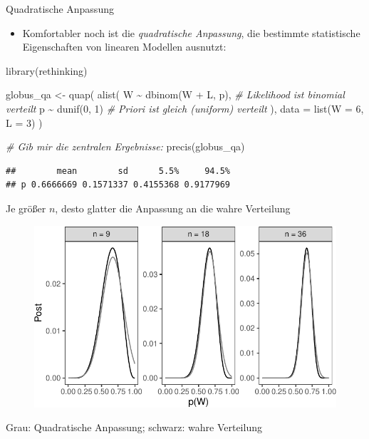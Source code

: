 \documentclass[
  ngerman,
  ignorenonframetext,
]{beamer}
\newenvironment{Shaded}{\begin{snugshade}}{\end{snugshade}}
\newcommand{\AttributeTok}[1]{\textcolor[rgb]{0.77,0.63,0.00}{#1}}
\newcommand{\CommentTok}[1]{\textcolor[rgb]{0.56,0.35,0.01}{\textit{#1}}}
\newcommand{\DecValTok}[1]{\textcolor[rgb]{0.00,0.00,0.81}{#1}}
\newcommand{\FunctionTok}[1]{\textcolor[rgb]{0.00,0.00,0.00}{#1}}
\newcommand{\NormalTok}[1]{#1}
\newcommand{\OtherTok}[1]{\textcolor[rgb]{0.56,0.35,0.01}{#1}}
\newcommand{\SpecialCharTok}[1]{\textcolor[rgb]{0.00,0.00,0.00}{#1}}
\providecommand{\tightlist}{%
  \setlength{\itemsep}{0pt}\setlength{\parskip}{0pt}}
\begin{document}
\begin{frame}[fragile]{Quadratische Anpassung}
\protect\hypertarget{quadratische-anpassung}{}
\begin{itemize}
\tightlist
\item
  Komfortabler noch ist die \emph{quadratische Anpassung}, die bestimmte
  statistische Eigenschaften von linearen Modellen ausnutzt:
\end{itemize}

\tiny

\begin{Shaded}
\begin{Highlighting}[]
\FunctionTok{library}\NormalTok{(rethinking)}

\NormalTok{globus\_qa }\OtherTok{\textless{}{-}} \FunctionTok{quap}\NormalTok{(}
  \FunctionTok{alist}\NormalTok{(}
\NormalTok{    W }\SpecialCharTok{\textasciitilde{}} \FunctionTok{dbinom}\NormalTok{(W }\SpecialCharTok{+}\NormalTok{ L, p),  }\CommentTok{\# Likelihood ist binomial verteilt}
\NormalTok{    p }\SpecialCharTok{\textasciitilde{}} \FunctionTok{dunif}\NormalTok{(}\DecValTok{0}\NormalTok{, }\DecValTok{1}\NormalTok{)        }\CommentTok{\# Priori ist gleich (uniform) verteilt}
\NormalTok{  ), }
  \AttributeTok{data =} \FunctionTok{list}\NormalTok{(}\AttributeTok{W =} \DecValTok{6}\NormalTok{, }\AttributeTok{L =} \DecValTok{3}\NormalTok{)}
\NormalTok{)}

\CommentTok{\# Gib mir die zentralen Ergebnisse:}
\FunctionTok{precis}\NormalTok{(globus\_qa)}
\end{Highlighting}
\end{Shaded}

\begin{verbatim}
##        mean        sd      5.5%     94.5%
## p 0.6666669 0.1571337 0.4155368 0.9177969
\end{verbatim}

\normalsize
\end{frame}

\begin{frame}{Je größer \(n\), desto glatter die Anpassung an die wahre
Verteilung}
\protect\hypertarget{je-gruxf6uxdfer-n-desto-glatter-die-anpassung-an-die-wahre-verteilung}{}
\begin{figure}[H]
\includegraphics[width=1\linewidth]{unnamed-chunk-29-1} \end{figure}

Grau: Quadratische Anpassung; schwarz: wahre Verteilung
\end{frame}
\end{document}
